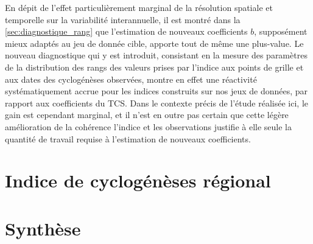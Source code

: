 \documentclass[../main.tex]{subfiles}
\begin{document}
En dépit de l'effet particulièrement marginal de la résolution spatiale et temporelle sur la variabilité interannuelle, il est montré dans la
\cref{sec:diagnostique_rang} que l'estimation de nouveaux coefficients $b$, supposément mieux adaptés au jeu de donnée cible, apporte tout de même une
plus-value. Le nouveau diagnostique qui y est introduit, consistant en la mesure des paramètres de la distribution des rangs des valeurs prises par l'indice aux
points de grille et aux dates des cyclogénèses observées, montre en effet une réactivité systématiquement accrue pour les indices construits sur nos jeux de
données, par rapport aux coefficients du TCS. Dans le contexte précis de l'étude réalisée ici, le gain est cependant marginal, et il n'est en outre pas certain
que cette légère amélioration de la cohérence l'indice et les observations justifie à elle seule la quantité de travail requise à l'estimation de nouveaux
coefficients.

\section{Indice de cyclogénèses régional}

%
%
%
%


\section{Synthèse}
\end{document}
